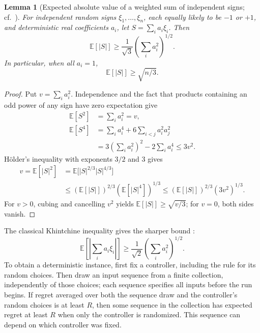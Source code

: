 \documentclass[11pt]{article}
\newcommand{\E}{\mathbb{E}}
\theoremstyle{plain}
\newtheorem{Thm:Lemma}[Thm:Theorem]{Lemma}
\theoremstyle{remark}
\numberwithin{equation}{section}
\begin{document}
\begin{Thm:Lemma}[Expected absolute value of a weighted sum of independent signs; cf.~{\cite{haagerup1981khintchine}}]
\label{lem:intro:signs}\label{ch6:lem:signs}
For independent random signs $\xi_1,\ldots,\xi_n$, each equally likely to be
$-1$ or $+1$, and deterministic real coefficients $a_i$, let
$S=\sum_i a_i\xi_i$. Then
\begin{equation}\label{eq:intro:sign-moment}
 \E[|S|]\ge\frac1{\sqrt3}\left(\sum_i a_i^2\right)^{1/2}.
\end{equation}
In particular, when all $a_i=1$,
\begin{equation}\label{ch6:eq:signs}
 \E[|S|]\ge\sqrt{n/3}.
\end{equation}
\end{Thm:Lemma}
\begin{proof}
Put $v=\sum_i a_i^2$.  Independence and the fact that products containing an
odd power of any sign have zero expectation give
\begin{align*}
 \E[S^2]&=\sum_i a_i^2=v,\\
 \E[S^4]
 &=\sum_i a_i^4+6\sum_{i<j}a_i^2a_j^2\\
 &=3\left(\sum_i a_i^2\right)^2-2\sum_i a_i^4
 \le3v^2.
\end{align*}
H\"older's inequality with exponents $3/2$ and $3$ gives
\begin{align*}
 v=\E[|S|^2]
 &=\E\bigl[|S|^{2/3}|S|^{4/3}\bigr]\\
 &\le(\E[|S|])^{2/3}(\E[|S|^4])^{1/3}
 \le(\E[|S|])^{2/3}(3v^2)^{1/3}.
\end{align*}
For $v>0$, cubing and cancelling $v^2$ yields
$\E[|S|]\ge\sqrt{v/3}$; for $v=0$, both sides vanish.
\end{proof}

The classical Khintchine inequality gives the sharper bound
\cite{haagerup1981khintchine}:
\begin{equation}\label{eq:intro:khintchine}
 \E\left[\left|\sum_i a_i\xi_i\right|\right]
 \ge\frac1{\sqrt2}\left(\sum_i a_i^2\right)^{1/2}.
\end{equation}
To obtain a deterministic instance, first fix a controller, including the
rule for its random choices. Then draw an input sequence from a finite
collection, independently of those choices; each sequence specifies all
inputs before the run begins. If regret averaged over both the sequence
draw and the controller's random choices is at least $R$, then some
sequence in the collection has expected regret at least $R$ when only
the controller is randomized. This sequence can depend on which
controller was fixed.



\end{document}
